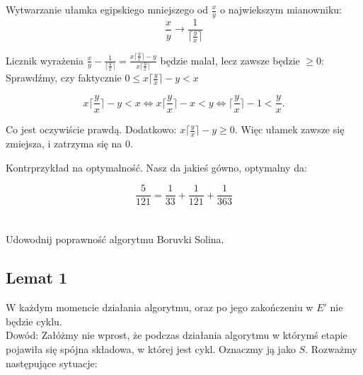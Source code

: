 \documentclass[svgnames]{report}
\begin{document}
Wytwarzanie ułamka egipskiego mniejszego od $\frac{x}{y}$ o najwiekszym mianowniku: 
\[\frac{x}{y} \rightarrow \frac{1}{\lceil \frac{y}{x} \rceil}\]

\noindent Licznik wyrażenia $\frac{x}{y} - \frac{1}{\lceil \frac{y}{x} \rceil} = \frac{x \lceil \frac{y}{x} \rceil - y}{x\lceil \frac{y}{x} \rceil}$ będzie malał, lecz zawsze będzie $\ge 0$:\\

\noindent Sprawdźmy, czy faktycznie $ 0 \leq x \lceil \frac{y}{x} \rceil - y < x$

\[x \lceil \frac{y}{x} \rceil - y < x \Leftrightarrow x \lceil \frac{y}{x} \rceil - x < y \Leftrightarrow \lceil \frac{y}{x} \rceil - 1 < \frac{y}{x} \textrm{.}\]

\noindent Co jest oczywiście prawdą. Dodatkowo: $x \lceil \frac{y}{x} \rceil - y \ge 0$. Więc ułamek zawsze się zmiejsza, i zatrzyma się na $0$.

\noindent Kontrprzykład na optymalność. Nasz da jakieś gówno, optymalny da:

\[\frac{5}{121}=\frac{1}{33}+\frac{1}{121}+\frac{1}{363}\]


\section{}
\begin{framed}
Udowodnij poprawność algorytmu Boruvki Solina.
\end{framed}


\subsection{Lemat 1}
\noindent W każdym momencie działania algorytmu, oraz po jego zakończeniu w $E'$ nie będzie cyklu.\\

\noindent Dowód: Załóżmy nie wprost, że podczas działania algorytmu w którymś etapie pojawiła się spójna składowa, w której jest cykl. Oznaczmy ją jako $S$. Rozważmy następujące sytuacje:\\
\end{document}
